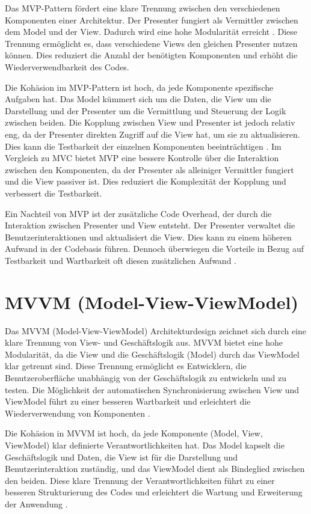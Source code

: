 Das \ac{MVP}-Pattern fördert eine klare Trennung zwischen den verschiedenen Komponenten einer Architektur. Der Presenter fungiert als Vermittler zwischen dem Model und der View. Dadurch wird eine hohe Modularität erreicht \cite{qureshi2024}. Diese Trennung ermöglicht es, dass verschiedene Views den gleichen Presenter nutzen können. Dies reduziert die Anzahl der benötigten Komponenten und erhöht die Wiederverwendbarkeit des Codes.

Die Kohäsion im \ac{MVP}-Pattern ist hoch, da jede Komponente spezifische Aufgaben hat. Das Model kümmert sich um die Daten, die View um die Darstellung und der Presenter um die Vermittlung und Steuerung der Logik zwischen beiden. Die Kopplung zwischen View und Presenter ist jedoch relativ eng, da der Presenter direkten Zugriff auf die View hat, um sie zu aktualisieren. Dies kann die Testbarkeit der einzelnen Komponenten beeinträchtigen \cite{aihara2012mvc}. Im Vergleich zu \ac{MVC} bietet \ac{MVP} eine bessere Kontrolle über die Interaktion zwischen den Komponenten, da der Presenter als alleiniger Vermittler fungiert und die View passiver ist. Dies reduziert die Komplexität der Kopplung und verbessert die Testbarkeit.

Ein Nachteil von \ac{MVP} ist der zusätzliche Code Overhead, der durch die Interaktion zwischen Presenter und View entsteht. Der Presenter verwaltet die Benutzerinteraktionen und aktualisiert die View. Dies kann zu einem höheren Aufwand in der Codebasis führen. Dennoch überwiegen die Vorteile in Bezug auf Testbarkeit und Wartbarkeit oft diesen zusätzlichen Aufwand \cite{qureshi2024}.

\section{MVVM (Model-View-ViewModel)}

Das \ac{MVVM} (Model-View-ViewModel) Architekturdesign zeichnet sich durch eine klare Trennung von View- und Geschäftslogik aus. \ac{MVVM} bietet eine hohe Modularität, da die View und die Geschäftslogik (Model) durch das ViewModel klar getrennt sind. Diese Trennung ermöglicht es Entwicklern, die Benutzeroberfläche unabhängig von der Geschäftslogik zu entwickeln und zu testen. Die Möglichkeit der automatischen Synchronisierung zwischen View und ViewModel führt zu einer besseren Wartbarkeit und erleichtert die Wiederverwendung von Komponenten \cite{arcos2018comparative}.

Die Kohäsion in \ac{MVVM} ist hoch, da jede Komponente (Model, View, ViewModel) klar definierte Verantwortlichkeiten hat. Das Model kapselt die Geschäftslogik und Daten, die View ist für die Darstellung und Benutzerinteraktion zuständig, und das ViewModel dient als Bindeglied zwischen den beiden. Diese klare Trennung der Verantwortlichkeiten führt zu einer besseren Strukturierung des Codes und erleichtert die Wartung und Erweiterung der Anwendung \cite{arcos2018comparative}.

